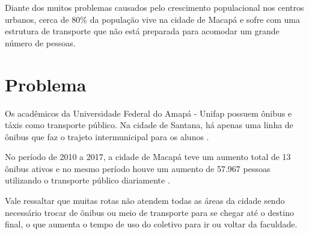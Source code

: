 Diante dos muitos problemas causados pelo crescimento populacional nos centros urbanos, cerca de 80\% da população vive na cidade de Macapá e sofre com uma estrutura de transporte que não está preparada para acomodar um grande número de pessoas.

\section {Problema}
\begin{comment}
	Na cidade de Macapá e Santana, as duas maiores cidade do Amapá, o número de transporte coletivo é baixo,
	existe apenas duas rodovias que interligam as cidades, 
	se locomover se torna difícil \cite{sau2018}. %
	
	Com tantos problemas aparentes causadas pelo grande inchaço populacional que  vive nas áreas urbanas, cerca de 80\% da população das duas cidades reside em áreas urbanas e sofre com a insuficiência do sistema de transporte público oferecido \cite{tostes}.
\end{comment}

Os acadêmicos da Universidade Federal do Amapá - Unifap possuem ônibus e táxis como transporte público. Na cidade de Santana, há apenas uma linha de ônibus que faz o trajeto intermunicipal para os alunos \cite{sau2018}.

No período de 2010 a 2017, a cidade de Macapá teve um aumento total de 13 ônibus ativos e no mesmo período houve um aumento de 57.967 pessoas utilizando o transporte público diariamente \cite{sau2018}.

Vale ressaltar que muitas rotas não atendem todas as áreas da cidade sendo necessário trocar de ônibus ou meio de transporte para se chegar até o destino final, o que aumenta o tempo de uso do coletivo para ir ou voltar da faculdade.

